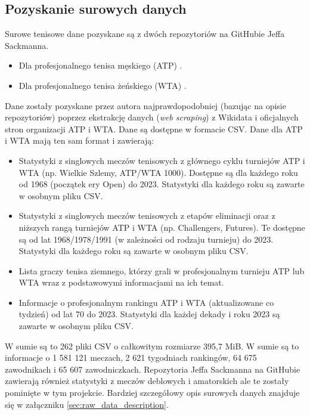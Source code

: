 \documentclass[12pt, a4paper]{article}
\begin{document}
\subsection{Pozyskanie surowych danych} \label{sec:obtain_raw_data}
Surowe tenisowe dane pozyskane są z dwóch repozytoriów na GitHubie Jeffa Sackmanna.
\begin{itemize}
    \item Dla profesjonalnego tenisa męskiego (ATP) \cite{tennis_atp}.
    \item Dla profesjonalnego tenisa żeńskiego (WTA) \cite{tennis_wta}.
\end{itemize}
Dane zostały pozyskane przez autora najprawdopodobniej (bazując na opisie repozytoriów) poprzez ekstrakcję danych (\textit{web scraping}) z Wikidata i oficjalnych stron organizacji ATP i WTA. Dane są dostępne w formacie CSV. Dane dla ATP i WTA mają ten sam format i zawierają:
\begin{itemize}
    \item Statystyki z singlowych meczów tenisowych z głównego cyklu turniejów ATP i WTA (np. Wielkie Szlemy, ATP/WTA 1000). Dostępne są dla każdego roku od 1968 (początek ery Open) do 2023. Statystyki dla każdego roku są zawarte w osobnym pliku CSV.
    \item Statystyki z singlowych meczów tenisowych z etapów eliminacji oraz z niższych rangą turniejów ATP i WTA (np. Challengers, Futures). Te dostępne są od lat 1968/1978/1991 (w zależności od rodzaju turnieju) do 2023. Statystyki dla każdego roku są zawarte w osobnym pliku CSV.
    \item Lista graczy tenisa ziemnego, którzy grali w profesjonalnym turnieju ATP lub WTA wraz z podstawowymi informacjami na ich temat.
    \item Informacje o profesjonalnym rankingu ATP i WTA (aktualizowane co tydzień) od lat 70 do 2023. Statystyki dla każdej dekady i roku 2023 są zawarte w osobnym pliku CSV.
\end{itemize}
W sumie są to 262 pliki CSV o całkowitym rozmiarze 395,7 MiB. W sumie są to informacje o 1 581 121 meczach, 2 621 tygodniach rankingów, 64 675 zawodnikach i 65 607 zawodniczkach. Repozytoria Jeffa Sackmanna na GitHubie zawierają również statystyki z meczów deblowych i amatorskich ale te zostały pominięte w tym projekcie. Bardziej szczegółowy opis surowych danych znajduje się w załączniku \ref{sec:raw_data_description}.
\end{document}
